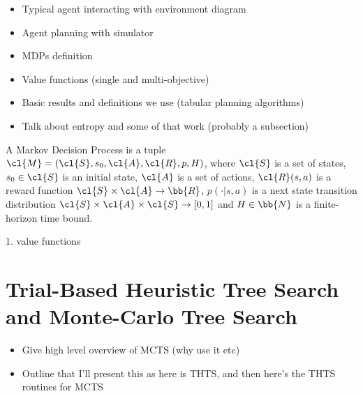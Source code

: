     \begin{itemize}
        \item Typical agent interacting with environment diagram 
        \item Agent planning with simulator 
        \item MDPs definition
        \item Value functions (single and multi-objective)
        \item Basic results and definitions we use (tabular planning algorithms)
        \item Talk about entropy and some of that work (probably a subsection)
    \end{itemize}

    \begin{defn}
        \label{def:mdp}
        A \textnormal{Markov Decision Process} is a tuple $\cl{M}=(\cl{S},s_0,\cl{A},\cl{R},p,H)$, where $\cl{S}$ is a 
        set of states, $s_0\in\cl{S}$ is an initial state, $\cl{A}$ is a set of actions, $\cl{R}(s,a)$ is a reward 
        function $\cl{S}\times \cl{A}\rightarrow \bb{R}$, $p(\cdot | s,a)$ is a next state transition distribution 
        $\cl{S} \times \cl{A} \times \cl{S} \rightarrow [0,1]$ and $H\in\bb{N}$ is a finite-horizon time bound. 
    \end{defn}

    1. value functions



\section{Trial-Based Heuristic Tree Search and Monte-Carlo Tree Search}
\label{sec:2-2-thts}

    \begin{itemize}
        \item Give high level overview of MCTS (why use it etc)
        \item Outline that I'll present this as here is THTS, and then here's the THTS routines for MCTS
    \end{itemize}

